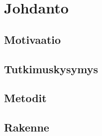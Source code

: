 \chapter{Johdanto} \label{Johdanto}

\section{Motivaatio}

\section{Tutkimuskysymys}


\section{Metodit}

\section{Rakenne}
